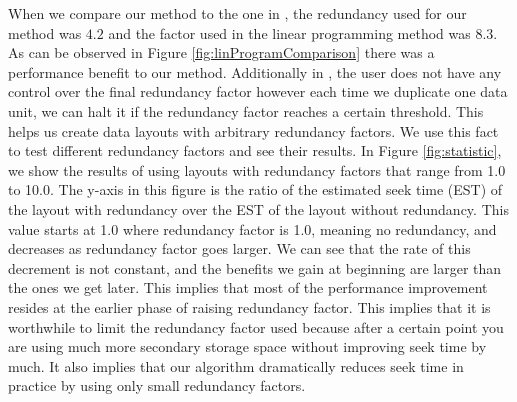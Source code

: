 When we compare our method to the one in \cite{optimizingredundancy}, the redundancy used for our method was $4.2$ and the factor used in the linear programming method was $8.3$. As can be observed in Figure \ref{fig:linProgramComparison} there was a performance benefit to our method. Additionally in \cite{optimizingredundancy}, the user does not have any control over the final redundancy factor however each time we duplicate one data unit, we can halt it if the redundancy factor reaches a certain threshold. This helps us create data layouts with arbitrary redundancy factors. We use this fact to test different redundancy factors and see their results. In Figure \ref{fig:statistic}, we show the results of using layouts with redundancy factors that range from 1.0 to 10.0. The y-axis in this figure is the ratio of the estimated seek time (EST) of the layout with redundancy over the EST of the layout without redundancy. This value starts at 1.0 where redundancy factor is 1.0, meaning no redundancy, and decreases as redundancy factor goes larger. We can see that the rate of this decrement is not constant, and the benefits we gain at beginning are larger than the ones we get later. This implies that most of the performance improvement resides at the earlier phase of raising redundancy factor. This implies that it is worthwhile to limit the redundancy factor used because after a certain point you are using much more secondary storage space without improving seek time by much. It also implies that our algorithm dramatically reduces seek time in practice by using only small redundancy factors. 


